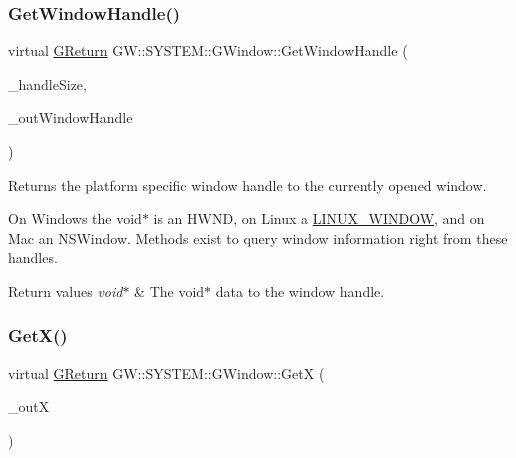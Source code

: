 \subsubsection{\texorpdfstring{Get\+Window\+Handle()}{GetWindowHandle()}}
{\footnotesize\ttfamily virtual \mbox{\hyperlink{namespace_g_w_a67a839e3df7ea8a5c5686613a7a3de21}{G\+Return}} G\+W\+::\+S\+Y\+S\+T\+E\+M\+::\+G\+Window\+::\+Get\+Window\+Handle (\begin{DoxyParamCaption}\item[{unsigned int}]{\+\_\+handle\+Size,  }\item[{void $\ast$$\ast$}]{\+\_\+out\+Window\+Handle }\end{DoxyParamCaption})\hspace{0.3cm}{\ttfamily [pure virtual]}}



Returns the platform specific window handle to the currently opened window. 

On Windows the void$\ast$ is an H\+W\+ND, on Linux a \mbox{\hyperlink{struct_g_w_1_1_s_y_s_t_e_m_1_1_l_i_n_u_x___w_i_n_d_o_w}{L\+I\+N\+U\+X\+\_\+\+W\+I\+N\+D\+OW}}, and on Mac an N\+S\+Window. Methods exist to query window information right from these handles.


\begin{DoxyRetVals}{Return values}
{\em void$\ast$} & The void$\ast$ data to the window handle. \\
\hline
\end{DoxyRetVals}
\mbox{\label{class_g_w_1_1_s_y_s_t_e_m_1_1_g_window_a61da1f01be5fa48df2375701ed0062e9}} 
\subsubsection{\texorpdfstring{Get\+X()}{GetX()}}
{\footnotesize\ttfamily virtual \mbox{\hyperlink{namespace_g_w_a67a839e3df7ea8a5c5686613a7a3de21}{G\+Return}} G\+W\+::\+S\+Y\+S\+T\+E\+M\+::\+G\+Window\+::\+GetX (\begin{DoxyParamCaption}\item[{unsigned int \&}]{\+\_\+outX }\end{DoxyParamCaption})\hspace{0.3cm}{\ttfamily [pure virtual]}}



